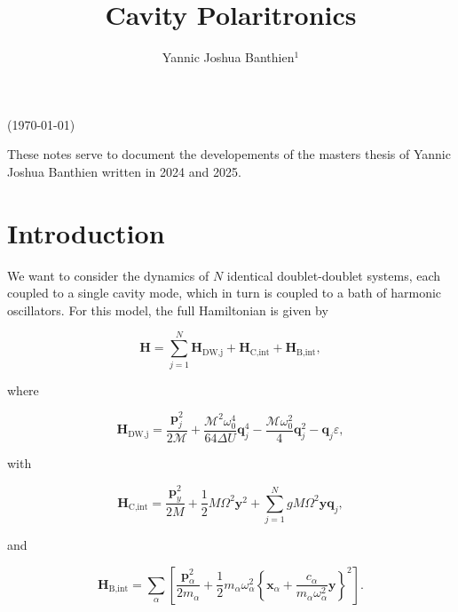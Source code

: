 \documentclass[preprint]{revtex4-2}
\begin{document}
 

\title{Cavity Polaritronics}
	\author{Yannic Joshua Banthien$^{1}$}
	
\maketitle

\centerline{(\today)}

These notes serve to document the developements of the masters thesis of Yannic Joshua Banthien written
in 2024 and 2025.

\section{Introduction}

We want to consider the dynamics of $N$ identical doublet-doublet systems, each coupled to a single 
cavity mode, which in turn is coupled to a bath of harmonic oscillators. For this model, the full
Hamiltonian is given by 

\begin{equation}
    \mathbf{H} = \sum_{j=1}^{N} \mathbf{H}_{\text{DW,j}} + \mathbf{H}_{\text{C,int}} + \mathbf{H}_{\text{B,int}},
\end{equation}

where

\begin{equation}
    \mathbf{H}_{\text{DW,j}} = \frac{\mathbf{p}^2_j}{2\mathcal{M}} + \frac{\mathcal{M}^2\omega_0^4}{64\Delta U}\mathbf{q}_j^4
    - \frac{\mathcal{M}\omega_0^2}{4}\mathbf{q}_j^2 - \mathbf{q}_j\varepsilon,
\end{equation}

with

\begin{equation}
    \mathbf{H}_{\text{C,int}} = \frac{\mathbf{p}_y^2}{2M} + \frac{1}{2}M\Omega^2\mathbf{y}^2 + \sum_{j=1}^{N}gM\Omega^2\mathbf{y}\mathbf{q}_j,
\end{equation}

and

\begin{equation}
    \mathbf{H}_{\text{B,int}} = \sum_{\alpha} \left[ \frac{\mathbf{p}_\alpha^2}{2m_\alpha} 
    + \frac{1}{2}m_\alpha \omega_\alpha^2 \left\{ \mathbf{x}_\alpha + \frac{c_\alpha}{m_\alpha \omega_\alpha^2}
    \mathbf{y} \right\}^2 \right].
\end{equation}
\end{document}
